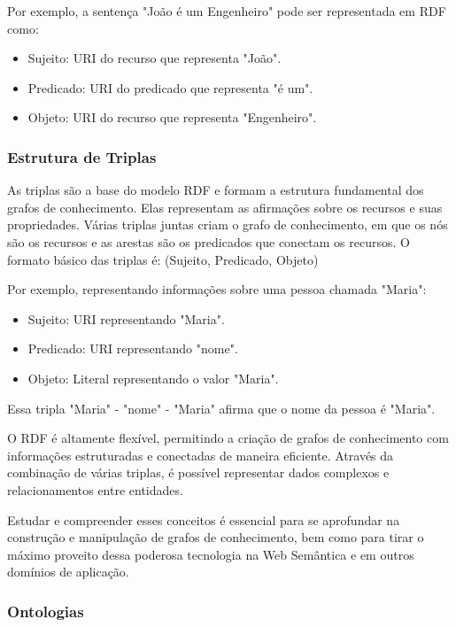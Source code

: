 Por exemplo, a sentença "João é um Engenheiro" pode ser representada em RDF como:

\begin{itemize}
    \item Sujeito: URI do recurso que representa "João".
    \item Predicado: URI do predicado que representa "é um".
    \item Objeto: URI do recurso que representa "Engenheiro".
\end{itemize}

\subsubsection{Estrutura de Triplas}

As triplas são a base do modelo RDF e formam a estrutura fundamental dos grafos de conhecimento. Elas representam as afirmações sobre os recursos e suas propriedades. Várias triplas juntas criam o grafo de conhecimento, em que os nós são os recursos e as arestas são os predicados que conectam os recursos.
O formato básico das triplas é:
(Sujeito, Predicado, Objeto)

Por exemplo, representando informações sobre uma pessoa chamada "Maria":

\begin{itemize}
    \item Sujeito: URI representando "Maria".
    \item Predicado: URI representando "nome".
    \item Objeto: Literal representando o valor "Maria".
\end{itemize}

Essa tripla "Maria" - "nome" - "Maria" afirma que o nome da pessoa é "Maria".

O RDF é altamente flexível, permitindo a criação de grafos de conhecimento com informações estruturadas e conectadas de maneira eficiente. Através da combinação de várias triplas, é possível representar dados complexos e relacionamentos entre entidades.

Estudar e compreender esses conceitos é essencial para se aprofundar na construção e manipulação de grafos de conhecimento, bem como para tirar o máximo proveito dessa poderosa tecnologia na Web Semântica e em outros domínios de aplicação.

\subsubsection{Ontologias}

